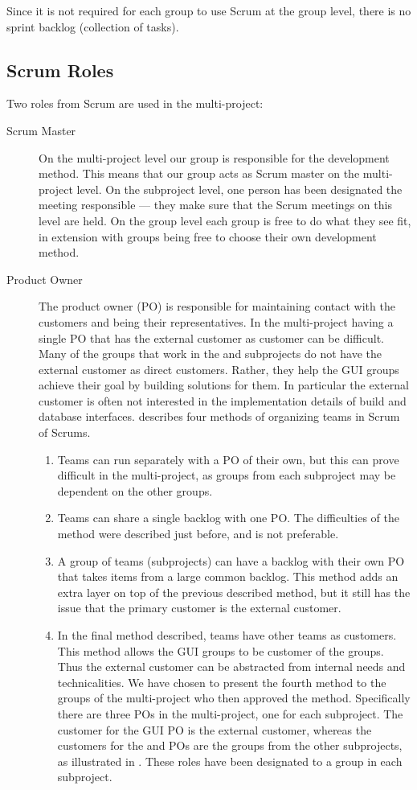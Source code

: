 Since it is not required for each group to use Scrum at the group level, there is no sprint backlog (collection of tasks).

\subsection{Scrum Roles}
Two roles from Scrum are used in the multi-project:

\begin{description}
  \item[Scrum Master] On the multi-project level our group is responsible for the development method. This means that our group acts as Scrum master on the multi-project level. On the subproject level, one person has been designated the meeting responsible --- they make sure that the Scrum meetings on this level are held. On the group level each group is free to do what they see fit, in extension with groups being free to choose their own development method.
  \item[Product Owner] The product owner (PO) is responsible for maintaining contact with the customers and being their representatives. In the multi-project having a single PO that has the external customer as customer can be difficult. Many of the groups that work in the \bd and \db subprojects do not have the external customer as direct customers. Rather, they help the GUI groups achieve their goal by building solutions for them. In particular the external customer is often not interested in the implementation details of build and database interfaces. \textcite{bird_davies_2007} describes four methods of organizing teams in Scrum of Scrums.
  \begin{enumerate}
    \item Teams can run separately with a PO of their own, but this can prove difficult in the multi-project, as groups from each subproject may be dependent on the other groups.
    \item Teams can share a single backlog with one PO. The difficulties of the method were described just before, and is not preferable.
    \item A group of teams (subprojects) can have a backlog with their own PO that takes items from a large common backlog. This method adds an extra layer on top of the previous described method, but it still has the issue that the primary customer is the external customer.
    \item In the final method described, teams have other teams as customers. This method allows the GUI groups to be customer of the \bd groups. Thus the external customer can be abstracted from internal needs and technicalities.
  We have chosen to present the fourth method to the groups of the multi-project who then approved the method. Specifically there are three POs in the multi-project, one for each subproject. The customer for the GUI PO is the external customer, whereas the customers for the \db and \bd POs are the groups from the other subprojects, as illustrated in . These roles have been designated to a group in each subproject.
  \end{enumerate}
\end{description}

